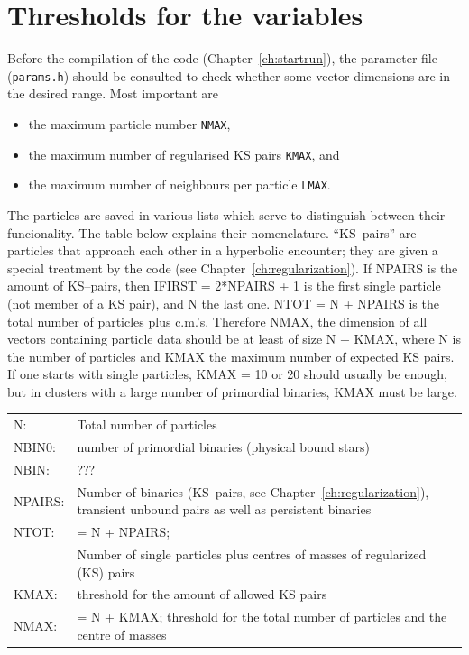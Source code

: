 
\section{Thresholds for the variables} \label{ch:thresholds}



Before the compilation of the code (Chapter~\ref{ch:startrun}),
the parameter file ({\tt params.h}) should be consulted to check
whether some vector dimensions are in the desired range.
Most important are
%
\begin{itemize}
\item the maximum particle number {\tt NMAX},
\item the maximum number of regularised KS pairs {\tt KMAX}, and
\item the maximum number of neighbours per particle {\tt LMAX}.
\end{itemize}


The particles are saved in various lists which serve to distinguish
between their funcionality.
The table below explains their nomenclature.
``KS--pairs'' are particles that approach each other in a hyperbolic
encounter; they are given a special treatment by the code (see
Chapter~\ref{ch:regularization}).
If NPAIRS is the amount of KS--pairs, then IFIRST = 2*NPAIRS + 1
is the first single particle (not member of a KS pair), and N the
last one.
NTOT = N + NPAIRS is the total number of particles plus c.m.'s.
Therefore NMAX, the dimension of all vectors containing particle
data should be at least of size N + KMAX, where N is the number of
particles and KMAX the maximum number of expected KS pairs.
If one starts with single particles, KMAX = 10 or 20 should usually
be enough, but in clusters with a large number of primordial binaries,
KMAX must be large.
%
\begin{longtable}{@{}p{1.5cm}p{13.0cm}}
N:      & Total number of particles\\
NBIN0:  & number of primordial binaries (physical bound stars)\\
NBIN:   &  ??? \\
NPAIRS: & Number of binaries (KS--pairs, see Chapter~\ref{ch:regularization}),
          transient unbound pairs as well as persistent binaries\\
NTOT:   & = N + NPAIRS; \\
        & Number of single particles plus centres of masses of
          regularized (KS) pairs \\
KMAX:   & threshold for the amount of allowed KS pairs\\
NMAX:   & = N + KMAX; threshold for the total number of particles and
          the centre of masses
\end{longtable}



\vspace{2cm}
\noindent
{}


